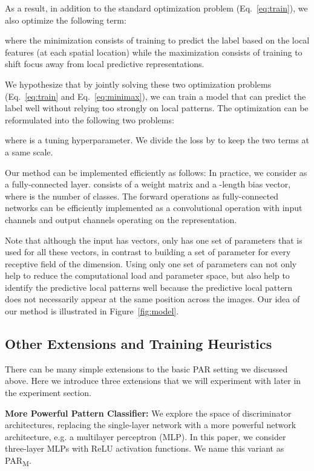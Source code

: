\documentclass{article}
\begin{document}
As a result, in addition to the standard optimization problem (Eq.~\ref{eq:train}), 
we also optimize the following term:

where the minimization consists of training  
to predict the label based on the local features (at each spatial location)
while the maximization consists of training  
to shift focus away from local predictive representations. 


We hypothesize that by jointly solving 
these two optimization problems 
(Eq.~\ref{eq:train} and Eq.~\ref{eq:minimax}), 
we can train a model that can predict the label well 
without relying too strongly on local patterns. 
The optimization can be reformulated 
into the following two problems:

where  is a tuning hyperparameter. 
We divide the loss by  to keep the two terms at a same scale. 

Our method can be implemented efficiently as follows: 
In practice, we consider  as a fully-connected layer. 
 consists of a  weight matrix and a -length bias vector, 
where  is the number of classes. 
The  forward operations as fully-connected networks
can be efficiently implemented as a  convolutional operation 
with  input channels and  output channels operating on the  representation. 

Note that although the input has  vectors,
 only has one set of parameters
that is used for all these vectors, 
in contrast to building a set of parameter 
for every receptive field of the  dimension. 
Using only one set of parameters can not only help 
to reduce the computational load and parameter space, 
but also help to identify the predictive local patterns well 
because the predictive local pattern does not necessarily appear
at the same position across the images. 
Our idea of our method is illustrated in Figure~\ref{fig:model}. 





\subsection{Other Extensions and Training Heuristics}
There can be many simple extensions to the basic PAR setting we discussed above. 
Here we introduce three extensions that we will experiment with 
later in the experiment section.  

\textbf{More Powerful Pattern Classifier:} 
We explore the space of discriminator architectures,
replacing the single-layer network  
with a more powerful network architecture, e.g. a multilayer perceptron (MLP). 
In this paper, we consider three-layer MLPs with ReLU activation functions. 
We name this variant as PAR\textsubscript{M}.
\end{document}

